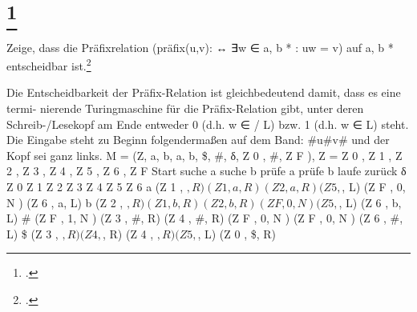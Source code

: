 \documentclass{lehramt-informatik-aufgabe}
\begin{document}
\liAufgabenTitel{}
\section{
\footcite{66112:2002:03}}

Zeige, dass die Präﬁxrelation (präﬁx(u,v): ↔ ∃w ∈ {a, b} * : uw = v) auf {a, b} *
entscheidbar ist.\footcite[Aufgabe 7a)]{theo:ab:4}

Die Entscheidbarkeit der Präﬁx-Relation ist gleichbedeutend damit, dass es eine termi-
nierende Turingmaschine für die Präﬁx-Relation gibt, unter deren Schreib-/Lesekopf am
Ende entweder 0 (d.h. w ∈
/ L) bzw. 1 (d.h. w ∈ L) steht.
Die Eingabe steht zu Beginn folgendermaßen auf dem Band: \#u\#v\# und der Kopf sei
ganz links.
M = (Z, {a, b}, {a, b, \$, \#}, δ, Z 0 , \#, {Z F }), Z = {Z 0 , Z 1 , Z 2 , Z 3 , Z 4 , Z 5 , Z 6 , Z F }
Start
suche a
suche b
prüfe a
prüfe b
laufe zurück
δ
Z 0
Z 1
Z 2
Z 3
Z 4
Z 5
Z 6
a (Z 1 , $, R) (Z 1 , a, R) (Z 2 , a, R)
(Z 5 , $, L) (Z F , 0, N )
(Z 6 , a, L)
b (Z 2 , $, R)
(Z 1 , b, R)
(Z 2 , b, R) (Z F , 0, N ) (Z 5 , $, L)
(Z 6 , b, L)
\# (Z F , 1, N ) (Z 3 , \#, R) (Z 4 , \#, R) (Z F , 0, N ) (Z F , 0, N ) (Z 6 , \#, L)
\$
(Z 3 , $, R) (Z 4 , $, R) (Z 4 , $, R) (Z 5 , $, L) (Z 0 , \$, R)
\end{document}
